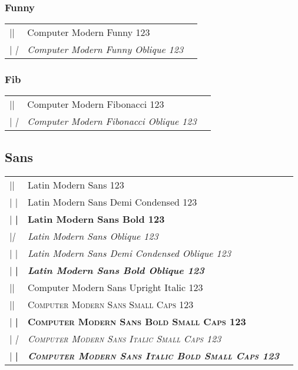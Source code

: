 \documentclass[a4paper]{article}
\makeatletter
\newenvironment{vrb}{\begin{tabular}{@{}p{5cm}ll@{}}}{\end{tabular}}
\makeatother
\begin{document}
\subsubsection*{Funny}

\selectfont
\begin{vrb}
|\fontfamily{cmfr}\selectfont | & {Computer Modern Funny 123} \\
|  \itshape| & {\itshape Computer Modern Funny Oblique 123} \\
\end{vrb}

\subsubsection*{Fib}

\selectfont
\begin{vrb}
|\fontfamily{cmfib}\selectfont | & {Computer Modern Fibonacci 123} \\
|  \slshape| & {\slshape Computer Modern Fibonacci Oblique 123} \\
\end{vrb}

\subsection*{Sans}

\sffamily
\begin{vrb}
|\sffamily| & {Latin Modern Sans 123} \\
|  \fontseries{sbc}\selectfont| & {\fontseries{sbc}\selectfont Latin Modern Sans Demi Condensed 123} \\
|  \bfseries| & {\bfseries Latin Modern Sans Bold 123} \\
|\slshape| & {\slshape Latin Modern Sans Oblique 123} \\
|  \fontseries{sbc}\selectfont| & {\fontseries{sbc}\selectfont\slshape Latin Modern Sans Demi Condensed Oblique 123} \\
|  \bfseries| & {\bfseries\slshape Latin Modern Sans Bold Oblique 123} \\
|\uishape| & {\uishape Computer Modern Sans Upright Italic 123} \\
|\scshape| & {\scshape Computer Modern Sans Small Caps 123} \\
|  \bfseries| & {\bfseries\scshape Computer Modern Sans Bold Small Caps 123} \\
|  \itshape| & {\itshape\scshape Computer Modern Sans Italic Small Caps 123} \\
|    \bfseries| & {\itshape\bfseries\scshape Computer Modern Sans Italic Bold Small Caps 123} \\
\end{vrb}
\end{document}
